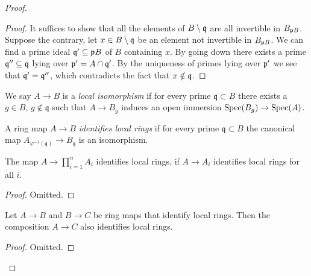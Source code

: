 \begin{proof}
\begin{proof}
  It suffices to show that all the elements of $B \setminus {\mathfrak{q}}$ are all invertible in $B_{{\mathfrak{p}} B}$. Suppose the contrary, let $x \in B \setminus {\mathfrak{q}}$ be an element not invertible in $B_{{\mathfrak{p}} B}$. We can find a prime ideal ${\mathfrak{q}}' \subseteq {\mathfrak{p}} B$ of $B$ containing $x$. By going down there exists a prime ${\mathfrak{q}}'' \subseteq {\mathfrak{q}}$ lying over ${\mathfrak{p}}' = A \cap {\mathfrak{q}}'$. By the uniqueness of primes lying over ${\mathfrak{p}}'$ we see that ${\mathfrak{q}}' = {\mathfrak{q}}''$, which contradicts the fact that $x \notin {\mathfrak{q}}$.
\end{proof}

\begin{definition}
  \label{def:local-isomorphism}
  We say $A \to B$ is a \emph{local isomorphism} if for every prime $\mathfrak{q} \subset B$ there exists a $g \in B$, $g \notin \mathfrak{q}$ such that $A \to B_g$ induces an open immersion $\operatorname{Spec} (B_g) \to \operatorname{Spec} (A)$.
\end{definition}

\begin{definition}
  A ring map $A \to B$ \emph{identifies local rings} if for every prime $\mathfrak{q} \subset B$ the canonical map $A_{\varphi^{-1}(\mathfrak{q})} \to B_{\mathfrak{q}}$ is an isomorphism.
  \label{def:identify-local-rings}
\end{definition}

\begin{lemma}
  \label{thm:finite-product-identifies-local-rings}
  The map \(A \to \prod_{i = 1}^{n} A_i \) identifies local rings, if \(A \to A_i\) identifies local rings for all \(i\).
\end{lemma}

\begin{proof}
  Omitted.
\end{proof}

\begin{lemma}
  \label{thm:identifies-local-rings-composition}
  Let \(A \to B\) and \(B \to C\) be ring maps that identify local rings. Then the composition \(A \to C\) also identifies local rings.
\end{lemma}

\begin{proof}
  Omitted.
\end{proof}


\end{proof}

